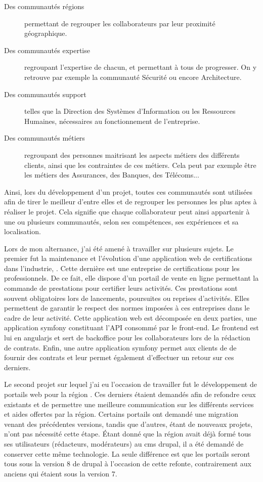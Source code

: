 \begin{description}
	\item [Des communautés régions] permettant de regrouper les collaborateurs par leur proximité géographique.
	\item [Des communautés expertise] regroupant l'expertise de chacun, et permettant à tous de progresser. On y retrouve par exemple la communauté Sécurité ou encore Architecture.
	\item [Des communautés support] telles que la Direction des Systèmes d'Information ou les Ressources Humaines, nécessaires au fonctionnement de l'entreprise.
	\item [Des communautés métiers] regroupant des personnes maitrisant les aspects métiers des différents clients, ainsi que les contraintes de ces métiers. Cela peut par exemple être les métiers des Assurances, des Banques, des Télécoms... 
\end{description}

Ainsi, lors du développement d'un projet, toutes ces communautés sont utilisées afin de tirer le meilleur d'entre elles et de regrouper les personnes les plus aptes à réaliser le projet. Cela signifie que chaque collaborateur peut ainsi appartenir à une ou plusieurs communautés, selon ses compétences, ses expériences et sa localisation. 

Lors de mon alternance, j'ai été amené à travailler sur plusieurs sujets. Le premier fut la maintenance et l'évolution d'une application web de certifications dans l'industrie, \bv. Cette dernière est une entreprise de certifications pour les professionnels. De ce fait, elle dispose d’un portail de vente en ligne permettant la commande de prestations pour certifier leurs activités. Ces prestations sont souvent obligatoires lors de lancements, poursuites ou reprises d'activités. Elles permettent de garantir le respect des normes imposées à ces entreprises dans le cadre de leur activité. Cette application web est décomposée en deux parties, une application \gls{symfony} constituant l'\gls{API} consommé par le front-end. Le \gls{frontend} est lui en \gls{angularjs} et sert de \gls{backoffice} pour les collaborateurs \bv{} lors de la rédaction de contrats. Enfin, une autre application \gls{symfony} permet aux clients de \bv{} de fournir des contrats et leur permet également d'effectuer un retour sur ces derniers.

Le second projet sur lequel j'ai eu l'occasion de travailler fut le développement de portails web pour la région \naq{}. Ces derniers étaient demandés afin de refondre ceux existants et de permettre une meilleure communication sur les différents services et aides offertes par la région. Certains portails ont demandé une migration venant des précédentes versions, tandis que d'autres, étant de nouveaux projets, n'ont pas nécessité cette étape. Étant donné que la région avait déjà formé tous ses utilisateurs (rédacteurs, modérateurs) au \gls{cms} \gls{drupal}, il a été demandé de conserver cette même technologie. La seule différence est que les portails seront tous sous la version 8 de \gls{drupal} à l'occasion de cette refonte, contrairement aux anciens qui étaient sous la version 7. 


